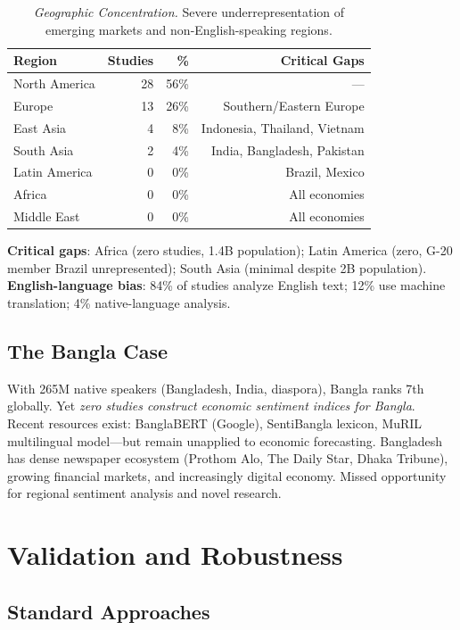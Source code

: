 \documentclass[11pt]{article}
\begin{document}
\begin{table}[H]
\centering \small
\begin{tabular}{lrrr}
\toprule
\textbf{Region} & \textbf{Studies} & \textbf{\%} & \textbf{Critical Gaps} \\
\midrule
North America & 28 & 56\% & — \\
Europe & 13 & 26\% & Southern/Eastern Europe \\
East Asia & 4 & 8\% & Indonesia, Thailand, Vietnam \\
South Asia & 2 & 4\% & India, Bangladesh, Pakistan \\
Latin America & 0 & 0\% & Brazil, Mexico \\
Africa & 0 & 0\% & All economies \\
Middle East & 0 & 0\% & All economies \\
\bottomrule
\end{tabular}
\caption{\textit{Geographic Concentration.} Severe underrepresentation of emerging markets and non-English-speaking regions.}
\end{table}

\textbf{Critical gaps}: Africa (zero studies, 1.4B population); Latin America (zero, G-20 member Brazil unrepresented); South Asia (minimal despite 2B population). \textbf{English-language bias}: 84\% of studies analyze English text; 12\% use machine translation; 4\% native-language analysis.

\subsection{The Bangla Case}

With 265M native speakers (Bangladesh, India, diaspora), Bangla ranks 7th globally. Yet \textit{zero studies construct economic sentiment indices for Bangla}. Recent resources exist: BanglaBERT (Google), SentiBangla lexicon, MuRIL multilingual model—but remain unapplied to economic forecasting. Bangladesh has dense newspaper ecosystem (Prothom Alo, The Daily Star, Dhaka Tribune), growing financial markets, and increasingly digital economy. Missed opportunity for regional sentiment analysis and novel research.

\section{Validation and Robustness}

\subsection{Standard Approaches}
\end{document}

